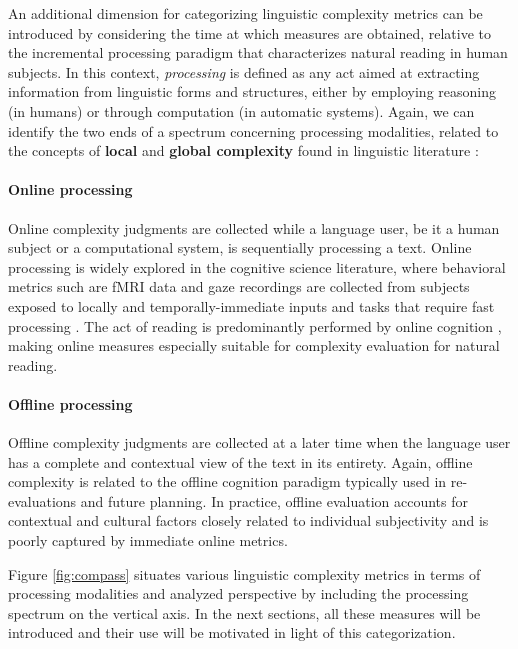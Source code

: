 \documentclass[a4paper, nobind]{templates/ociamthesis}
\begin{document}
An additional dimension for categorizing linguistic complexity metrics can be introduced by considering the time at which measures are obtained, relative to the incremental processing paradigm that characterizes natural reading in human subjects. In this context, \emph{processing} is defined as any act aimed at extracting information from linguistic forms and structures, either by employing reasoning (in humans) or through computation (in automatic systems). Again, we can identify the two ends of a spectrum concerning processing modalities, related to the concepts of \textbf{local} and \textbf{global complexity} found in linguistic literature \autocites{edmonds-1999-syntactic}{miestamo-2004-feasibility}{miestamo-2008-grammatical}:

\paragraph{Online processing} Online complexity judgments are collected while a language user, be it a human subject or a computational system, is sequentially processing a text. Online processing is widely explored in the cognitive science literature, where behavioral metrics such are fMRI data and gaze recordings are collected from subjects exposed to locally and temporally-immediate inputs and tasks that require fast processing \autocite{iverson-thelen-1999-hand}. The act of reading is predominantly performed by online cognition \autocite{meyer-rice-1992-prose}, making online measures especially suitable for complexity evaluation for natural reading.

\vspace{-12pt}

\paragraph{Offline processing} Offline complexity judgments are collected at a later time when the language user has a complete and contextual view of the text in its entirety. Again, offline complexity is related to the offline cognition paradigm \autocite{day-2004-religion} typically used in re-evaluations and future planning. In practice, offline evaluation accounts for contextual and cultural factors closely related to individual subjectivity and is poorly captured by immediate online metrics.

\vspace{10pt}

Figure \ref{fig:compass} situates various linguistic complexity metrics in terms of processing modalities and analyzed perspective by including the processing spectrum on the vertical axis. In the next sections, all these measures will be introduced and their use will be motivated in light of this categorization.
\end{document}
